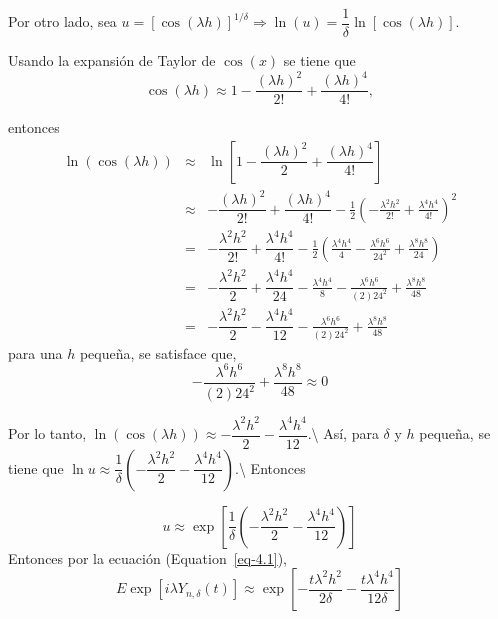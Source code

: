 \documentclass[
  letterpaper,
  DIV=11,
  numbers=noendperiod]{scrreprt}
\theoremstyle{plain}
\theoremstyle{definition}
\theoremstyle{remark}
\begin{document}
Por otro lado, sea
\(u=\left[\cos\left(\lambda h\right)\right]^{1/\delta}\Rightarrow\ln\left(u\right)=\dfrac{1}{\delta}\ln\left[\cos\left(\lambda h\right)\right]\).

Usando la expansión de Taylor de \(\cos\left(x\right)\) se tiene que \[
\cos\left(\lambda h\right)\approx1-\dfrac{\left(\lambda h\right)^{2}}{2!}+\dfrac{\left(\lambda h\right)^{4}}{4!},
\]

entonces \[
\begin{eqnarray}
    \ln\left(\cos\left(\lambda h\right)\right) & \approx & \ln\left[1-\dfrac{\left(\lambda h\right)^{2}}{2}+\dfrac{\left(\lambda h\right)^{4}}{4!}\right]\nonumber\\
 & \approx & -\dfrac{\left(\lambda h\right)^{2}}{2!}+\dfrac{\left(\lambda h\right)^{4}}{4!}-\frac{1}{2}\left(-\frac{\lambda^{2}h^{2}}{2!}+\frac{\lambda^{4}h^{4}}{4!}\right)^{2}\nonumber\\
  & = & -\dfrac{\lambda^{2} h^{2}}{2!}+\dfrac{\lambda ^{4}h^{4}}{4!}-\frac{1}{2}\left(\frac{\lambda^{4}h^{4}}{4}-\frac{\lambda^{6}h^{6}}{24^{2}}+\frac{\lambda^{8}h^{8}}{24}\right)\nonumber\\
   & = & -\dfrac{\lambda^{2} h^{2}}{2}+\dfrac{\lambda^{4} h^{4}}{24}-\frac{\lambda^{4}h^{4}}{8}-\frac{\lambda^{6}h^{6}}{(2)24^{2}}+\frac{\lambda^{8}h^{8}}{48}\nonumber\\
   & = & -\dfrac{\lambda^{2} h^{2}}{2}-\dfrac{\lambda^{4} h^{4}}{12}-\frac{\lambda^{6}h^{6}}{(2)24^{2}}+\frac{\lambda^{8}h^{8}}{48}
\end{eqnarray}
\] para una \(h\) pequeña, se satisface que, \[
-\frac{\lambda^{6}h^{6}}{(2)24^{2}}+\frac{\lambda^{8}h^{8}}{48}\approx 0
\]

Por lo tanto,
\(\ln\left(\cos\left(\lambda h\right)\right)\approx -\dfrac{\lambda^{2} h^{2}}{2}-\dfrac{\lambda^{4} h^{4}}{12}\).\textbackslash{}
Así, para \(\delta\) y \(h\) pequeña, se tiene que
\(\ln u\approx \dfrac{1}{\delta}\left(-\dfrac{\lambda^{2} h^{2}}{2}-\dfrac{\lambda^{4} h^{4}}{12}\right)\).\textbackslash{}
Entonces

\[
\begin{equation}
    u\approx\exp\left[\dfrac{1}{\delta}\left(-\dfrac{\lambda^{2} h^{2}}{2}-\dfrac{\lambda^{4} h^{4}}{12}\right)\right]
\end{equation}
\] Entonces por la ecuación (Equation~\ref{eq-4.1}), \[
\begin{equation}
    E\exp\left[i\lambda Y_{n,\delta}\left(t\right)\right]\approx\exp\left[-\dfrac{t\lambda^{2} h^{2}}{2\delta}-\dfrac{t\lambda^{4} h^{4}}{12\delta}\right]
\end{equation}
\]
\end{document}
